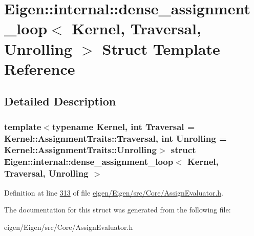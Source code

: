 \hypertarget{struct_eigen_1_1internal_1_1dense__assignment__loop}{}\section{Eigen\+:\+:internal\+:\+:dense\+\_\+assignment\+\_\+loop$<$ Kernel, Traversal, Unrolling $>$ Struct Template Reference}
\label{struct_eigen_1_1internal_1_1dense__assignment__loop}


\subsection{Detailed Description}
\subsubsection*{template$<$typename Kernel, int Traversal = Kernel\+::\+Assignment\+Traits\+::\+Traversal, int Unrolling = Kernel\+::\+Assignment\+Traits\+::\+Unrolling$>$\newline
struct Eigen\+::internal\+::dense\+\_\+assignment\+\_\+loop$<$ Kernel, Traversal, Unrolling $>$}



Definition at line \hyperlink{eigen_2_eigen_2src_2_core_2_assign_evaluator_8h_source_l00313}{313} of file \hyperlink{eigen_2_eigen_2src_2_core_2_assign_evaluator_8h_source}{eigen/\+Eigen/src/\+Core/\+Assign\+Evaluator.\+h}.



The documentation for this struct was generated from the following file\+:\begin{DoxyCompactItemize}
\item 
eigen/\+Eigen/src/\+Core/\+Assign\+Evaluator.\+h\end{DoxyCompactItemize}
